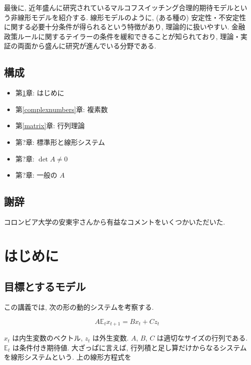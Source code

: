 \documentclass[a4paper]{scrbook}
\providecommand{\tightlist}{%
  \setlength{\itemsep}{0pt}\setlength{\parskip}{0pt}}
\theoremstyle{definition}
\begin{document}
最後に,
近年盛んに研究されているマルコフスイッチング合理的期待モデルという非線形モデルを紹介する.
線形モデルのように, (ある種の)
安定性・不安定性に関する必要十分条件が得られるという特徴があり,
理論的に扱いやすい.
金融政策ルールに関するテイラーの条件を緩和できることが知られており,
理論・実証の両面から盛んに研究が進んでいる分野である.

\section*{構成}

\begin{itemize}
\tightlist
\item
  第\ref{intro}章: はじめに
\item
  第\ref{complexnumbers}章: 複素数
\item
  第\ref{matrix}章: 行列理論
\item
  第?章: 標準形と線形システム
\item
  第?章: \(\det A \neq 0\)
\item
  第?章: 一般の \(A\)
\end{itemize}

\section*{謝辞}

コロンビア大学の安東宇さんから有益なコメントをいくつかいただいた.

\chapter{はじめに}\label{intro}

\section{目標とするモデル}

この講義では, 次の形の動的システムを考察する.

\[
\begin{equation}
  A\mathbb{E}_{t}x_{t+1}=Bx_{t}+Cz_{t} \label{eq:lre}
\end{equation}
\]

\(x_t\) は内生変数のベクトル, \(z_t\) は外生変数. \(A\), \(B\), \(C\)
は適切なサイズの行列である. \(\mathbb E_t\) は条件付き期待値.
大ざっぱに言えば,
行列積と足し算だけからなるシステムを線形システムという. 上の線形方程式を
\end{document}
